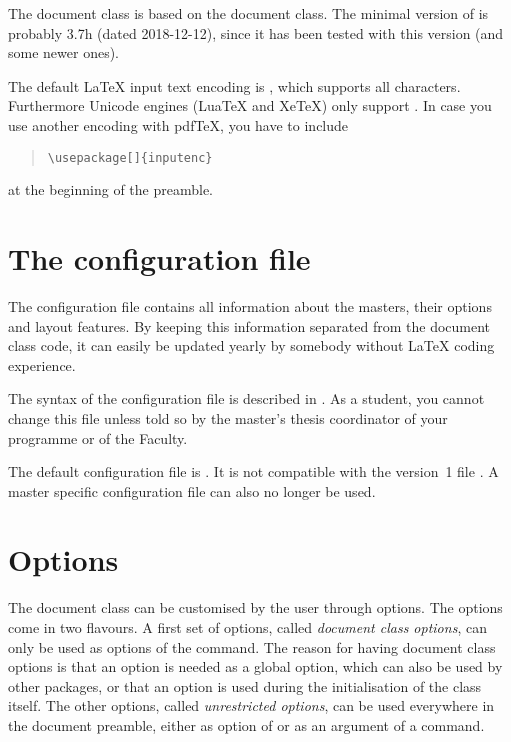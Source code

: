 The document class  is based on the  document class.
The minimal version of  is probably 3.7h (dated 2018-12-12), since
it has been tested with this version (and some newer ones).

The default LaTeX input text encoding is , which supports all
characters. Furthermore Unicode engines (LuaTeX and XeTeX) only support
. In case you use another encoding with pdfTeX, you have to
include
\begin{quote}
  \verb"\usepackage["\verb"]{inputenc}"
\end{quote}
at the beginning of the preamble.

\section{The configuration file}\label{sec:ini}
The configuration file contains all information about the masters, their
options and layout features. By keeping this information separated from the
document class code, it can easily be updated yearly by somebody without LaTeX
coding experience.

The syntax of the configuration file is described in \cite[Format of the
configuration file]{pkg:kulemt-code}. As a student, you cannot change this file
unless told so by the master's thesis coordinator of your programme or of the
Faculty.

The default configuration file is . It is not compatible with
the version~1 file . A master specific configuration file can
also no longer be used.

\section{Options}\label{sec:options}
The document class can be customised by the user through options. The
options come in two flavours. A first set of options, called
\emph{document class options}, can only be used as options of the
 command.
The reason for having document class options is that an option is needed as a
global option, which can also be used by other packages, or that an option is
used during the initialisation of the class itself. The other options, called
\emph{unrestricted options}, can be used everywhere in the document preamble,
either as option of  or as an argument of a 
command.

